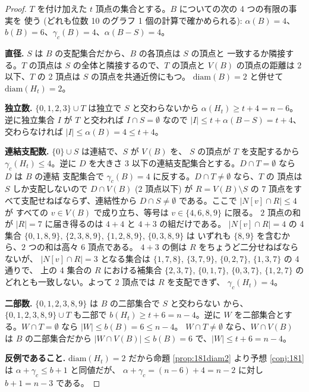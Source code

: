 \documentclass[paper=a4,fontsize=10.5pt,jafontsize=10.5pt]{jlreq}
\theoremstyle{plain}
\theoremstyle{definition}
\begin{document}
\begin{proof}
$T$ を付け加えた $t$ 頂点の集合とする。$B$ についての次の 4 つの有限の事実を
使う (どれも位数 10 のグラフ 1 個の計算で確かめられる):
$\alpha(B) = 4$、$b(B) = 6$、$\gamma_c(B) = 4$、$\alpha(B - S) = 4$。

\textbf{直径.} $S$ は $B$ の支配集合だから、$B$ の各頂点は $S$ の頂点と
一致するか隣接する。$T$ の頂点は $S$ の全体と隣接するので、$T$ の頂点と
$V(B)$ の頂点の距離は $2$ 以下、$T$ の 2 頂点は $S$ の頂点を共通近傍にもつ。
$\mathrm{diam}(B) = 2$ と併せて $\mathrm{diam}(H_t) = 2$。

\textbf{独立数.} $\{0,1,2,3\} \cup T$ は独立で $S$ と交わらないから
$\alpha(H_t) \ge t + 4 = n - 6$。逆に独立集合 $I$ が $T$ と交われば
$I \cap S = \emptyset$ なので $|I| \le t + \alpha(B - S) = t + 4$、
交わらなければ $|I| \le \alpha(B) = 4 \le t + 4$。

\textbf{連結支配数.} $\{0\} \cup S$ は連結で、$S$ が $V(B)$ を、
$S$ の頂点が $T$ を支配するから $\gamma_c(H_t) \le 4$。逆に $D$ を大きさ
$3$ 以下の連結支配集合とする。$D \cap T = \emptyset$ なら $D$ は $B$ の連結
支配集合で $\gamma_c(B) = 4$ に反する。$D \cap T \ne \emptyset$ なら、$T$ の
頂点は $S$ しか支配しないので $D \cap V(B)$ ($2$ 頂点以下) が
$R = V(B) \setminus S$ の $7$ 頂点をすべて支配せねばならず、連結性から
$D \cap S \ne \emptyset$ である。ここで $|N[v] \cap R| \le 4$ が
すべての $v \in V(B)$ で成り立ち、等号は $v \in \{4,6,8,9\}$ に限る。
$2$ 頂点の和が $|R| = 7$ に届き得るのは $4 + 4$ と $4 + 3$ の組だけである。
$|N[v] \cap R| = 4$ の 4 集合
$\{0,1,8,9\}$, $\{2,3,8,9\}$, $\{1,2,8,9\}$, $\{0,3,8,9\}$ は
いずれも $\{8,9\}$ を含むから、$2$ つの和は高々 $6$ 頂点である。
$4 + 3$ の側は $R$ をちょうど二分せねばならないが、
$|N[v] \cap R| = 3$ となる集合は
$\{1,7,8\}$, $\{3,7,9\}$, $\{0,2,7\}$, $\{1,3,7\}$ の 4 通りで、
上の 4 集合の $R$ における補集合
$\{2,3,7\}$, $\{0,1,7\}$, $\{0,3,7\}$, $\{1,2,7\}$ の
どれとも一致しない。よって $2$ 頂点では $R$ を支配できず、
$\gamma_c(H_t) = 4$。

\textbf{二部数.} $\{0,1,2,3,8,9\}$ は $B$ の二部集合で $S$ と交わらない
から、$\{0,1,2,3,8,9\} \cup T$ も二部で $b(H_t) \ge t + 6 = n - 4$。逆に
$W$ を二部集合とする。$W \cap T = \emptyset$ なら $|W| \le b(B) = 6 \le n-4$。
$W \cap T \ne \emptyset$ なら、$W \cap V(B)$ は $B$ の二部集合だから
$|W \cap V(B)| \le b(B) = 6$ で、$|W| \le t + 6 = n - 4$。

\textbf{反例であること.} $\mathrm{diam}(H_t) = 2$ だから命題
\ref{prop:181diam2} より予想 \ref{conj:181} は
$\alpha + \gamma_c \le b + 1$ と同値だが、
$\alpha + \gamma_c = (n-6) + 4 = n - 2$ に対し $b + 1 = n - 3$ である。
\end{proof}
\end{document}
